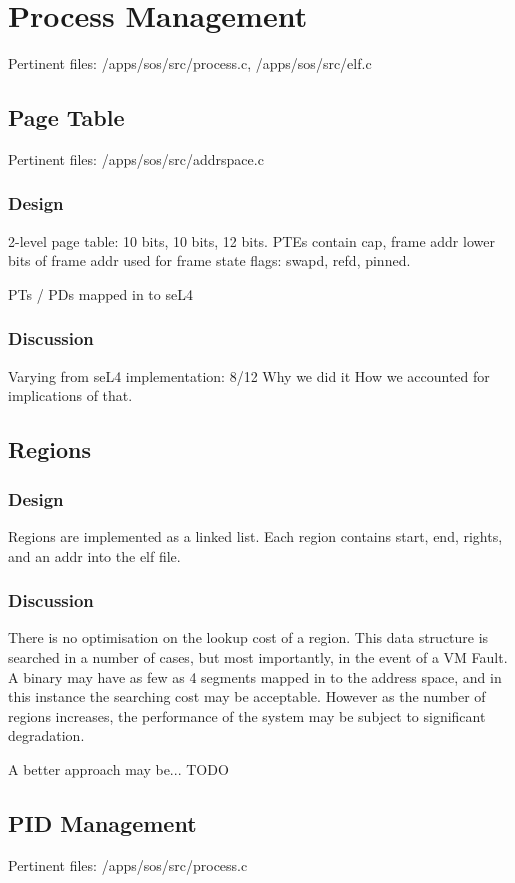 \documentclass[a4paper,12pt]{article}
\begin{document}
\section{Process Management}
Pertinent files: /apps/sos/src/process.c, /apps/sos/src/elf.c

\subsection{Page Table}
Pertinent files: /apps/sos/src/addrspace.c

\subsubsection{Design}
2-level page table: 10 bits, 10 bits, 12 bits.
PTEs contain cap, frame addr
lower bits of frame addr used for frame state flags: swapd, refd, pinned.

PTs / PDs mapped in to seL4
\subsubsection{Discussion}
Varying from seL4 implementation: 8/12
Why we did it
How we accounted for implications of that.

\subsection{Regions}
\subsubsection{Design}
Regions are implemented as a linked list.  Each region contains start, end,
rights, and an addr into the elf file.
\subsubsection{Discussion}
There is no optimisation on the lookup cost of a region.  This data structure
is searched in a number of cases, but most importantly, in the event of a VM
Fault.  A binary may have as few as 4 segments mapped in to the address space,
and in this instance the searching cost may be acceptable.  However as the
number of regions increases, the performance of the system may be subject to
significant degradation.

A better approach may be... TODO

\subsection{PID Management}
Pertinent files: /apps/sos/src/process.c
\end{document}
